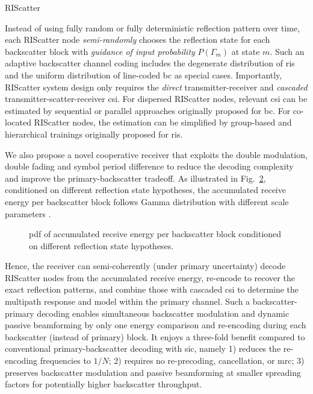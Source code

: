 \documentclass[journal,12pt,onecolumn,draftclsnofoot]{IEEEtran}
\theoremstyle{remark}
\begin{document}
\begin{section}{RIScatter}
\begin{figure}[!t]
{		}
		\label{fg:scatter_comparison}
	\end{figure}
	Instead of using fully random or fully deterministic reflection pattern over time, each RIScatter node \emph{semi-randomly} chooses the reflection state for each backscatter block with \emph{guidance of input probability} $P(\Gamma_m)$ at state $m$.
	Such an adaptive backscatter channel coding includes the degenerate distribution of \gls{ris} and the uniform distribution of line-coded \gls{bc} as special cases.
	Importantly, RIScatter system design only requires the \emph{direct} transmitter-receiver and \emph{cascaded} transmitter-scatter-receiver \gls{csi}.
	For dispersed RIScatter nodes, relevant \gls{csi} can be estimated by sequential \cite{Bharadia2015,Yang2015b,Guo2019g} or parallel approaches \cite{Jin2021a} originally proposed for \gls{bc}.
	For co-located RIScatter nodes, the estimation can be simplified by group-based \cite{Zheng2019} and hierarchical \cite{You2019} trainings originally proposed for \gls{ris}.

	We also propose a novel cooperative receiver that exploits the double modulation, double fading and symbol period difference to reduce the decoding complexity and improve the primary-backscatter tradeoff.
	As illustrated in Fig.~\ref{fg:energy_distribution}, conditioned on different reflection state hypotheses, the accumulated receive energy per backscatter block follows Gamma distribution with different scale parameters \cite{Qian2017b}.
	\begin{figure}[!t]
		\centering
		\resizebox{0.4\columnwidth}{!}{
			
		}
		\caption{
			\gls{pdf} of accumulated receive energy per backscatter block conditioned on different reflection state hypotheses.
		}
		\label{fg:energy_distribution}
	\end{figure}
	Hence, the receiver can semi-coherently (under primary uncertainty) decode RIScatter nodes from the accumulated receive energy, re-encode to recover the exact reflection patterns, and combine those with cascaded \gls{csi} to determine the multipath response and model within the primary channel.
	Such a backscatter-primary decoding enables simultaneous backscatter modulation and dynamic passive beamforming by only one energy comparison and re-encoding during each backscatter (instead of primary) block.
	It enjoys a three-fold benefit compared to conventional primary-backscatter decoding with \gls{sic}, namely
	1) reduces the re-encoding frequencies to $1/N$;
	2) requires no re-precoding, cancellation, or \gls{mrc};
	3) preserves backscatter modulation and passive beamforming at smaller spreading factors for potentially higher backscatter throughput.



\end{section}
\end{document}
